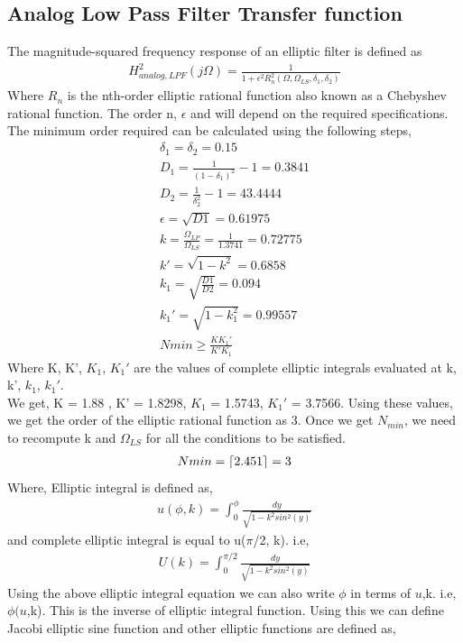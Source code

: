 \documentclass[12pt]{article}
\begin{document}
\subsection{Analog Low Pass Filter Transfer function}
\color{black}
The magnitude-squared frequency response of an elliptic filter is defined as
\begin{gather*}
	H_{analog,LPF}^2(j\Omega) = \frac{1}{1+\epsilon^2R_{n}^2(\Omega, \Omega_{LS}, \delta_1, \delta_2)}
\end{gather*}
Where $R_n$ is the nth-order elliptic rational function also known as a Chebyshev rational function. The order n, $\epsilon$ and will depend on the required specifications.
The minimum order required can be calculated using the following steps,
\begin{gather*}
\delta_1 = \delta_2 = 0.15\\
D_1 = \frac{1}{(1-\delta_1)^2} - 1 = 0.3841\\
D_2 = \frac{1}{\delta_2^2} - 1 = 43.4444\\
\epsilon = \sqrt{D1} = 0.61975\\
k = \frac{\Omega_{LP}}{\Omega_{LS}} =  \frac{1}{1.3741} = 0.72775\\
k' = \sqrt{1-k^2} = 0.6858\\
k_1 = \sqrt{\frac{D1}{D2}} = 0.094\\
k_1' = \sqrt{1-k_1^2} = 0.99557\\
Nmin \ge \frac{KK_1'}{K'K_1}
\end{gather*}
Where K, K', $K_1$, $K_1'$ are the values of complete elliptic integrals evaluated at k, k', $k_1$, $k_1'$.\\
We get, K = 1.88 , K' = 1.8298, $K_1$ = 1.5743, $K_1'$ = 3.7566. Using these values, we get the order of the elliptic rational function as 3. Once we get $N_{min}$, we need to recompute k and $\Omega_{LS}$ for all the conditions to be satisfied.
\begin{gather*}
	Nmin = \ceil{2.451} = 3 
\end{gather*}
Where, Elliptic integral is defined as,
\begin{gather*}
	u(\phi,k) = \int_{0}^{\phi} \frac{dy}{\sqrt{1-k^2sin^2(y)}}
\end{gather*} 
and complete elliptic integral is equal to u($\pi$/2, k). i.e,
\begin{gather*}
	U(k) = \int_{0}^{\pi/2} \frac{dy}{\sqrt{1-k^2sin^2(y)}}
\end{gather*}
Using the above elliptic integral equation we can also write $\phi$ in terms of $u$,k. i.e, $\phi(u$,k). This is the inverse of elliptic integral function. Using this we can define Jacobi elliptic sine function and other elliptic functions are defined as,
\end{document}

